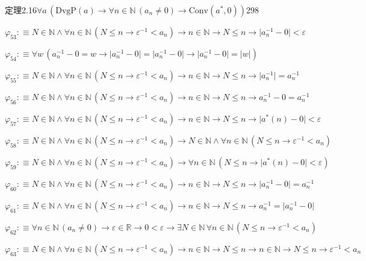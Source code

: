 \begin{fullproof}{定理2.16}{$\forall a\,(\mathrm{DvgP}(a) \to \forall n \in \mathbb{N}\,(a_{n} \neq 0) \to \mathrm{Conv}(a^{\ast},0))$}{298}
\begin{abbrevlist}
\item $\varphi_{53} :\equiv N \in \mathbb{N} \land \forall n \in \mathbb{N}\,(N \leq n \to \varepsilon^{-1} < a_{n}) \to n \in \mathbb{N} \to N \leq n \to \lvert a_{n}^{-1} - 0 \rvert < \varepsilon$
\item $\varphi_{54} :\equiv \forall w\,(a_{n}^{-1} - 0 = w \to \lvert a_{n}^{-1} - 0 \rvert = \lvert a_{n}^{-1} - 0 \rvert \to \lvert a_{n}^{-1} - 0 \rvert = \lvert w \rvert)$
\item $\varphi_{55} :\equiv N \in \mathbb{N} \land \forall n \in \mathbb{N}\,(N \leq n \to \varepsilon^{-1} < a_{n}) \to n \in \mathbb{N} \to N \leq n \to \lvert a_{n}^{-1} \rvert = a_{n}^{-1}$
\item $\varphi_{56} :\equiv N \in \mathbb{N} \land \forall n \in \mathbb{N}\,(N \leq n \to \varepsilon^{-1} < a_{n}) \to n \in \mathbb{N} \to N \leq n \to a_{n}^{-1} - 0 = a_{n}^{-1}$
\item $\varphi_{57} :\equiv N \in \mathbb{N} \land \forall n \in \mathbb{N}\,(N \leq n \to \varepsilon^{-1} < a_{n}) \to n \in \mathbb{N} \to N \leq n \to \lvert a^{\ast}(n) - 0 \rvert < \varepsilon$
\item $\varphi_{58} :\equiv N \in \mathbb{N} \land \forall n \in \mathbb{N}\,(N \leq n \to \varepsilon^{-1} < a_{n}) \to N \in \mathbb{N} \land \forall n \in \mathbb{N}\,(N \leq n \to \varepsilon^{-1} < a_{n})$
\item $\varphi_{59} :\equiv N \in \mathbb{N} \land \forall n \in \mathbb{N}\,(N \leq n \to \varepsilon^{-1} < a_{n}) \to \forall n \in \mathbb{N}\,(N \leq n \to \lvert a^{\ast}(n) - 0 \rvert < \varepsilon)$
\item $\varphi_{60} :\equiv N \in \mathbb{N} \land \forall n \in \mathbb{N}\,(N \leq n \to \varepsilon^{-1} < a_{n}) \to n \in \mathbb{N} \to N \leq n \to \lvert a_{n}^{-1} - 0 \rvert = a_{n}^{-1}$
\item $\varphi_{61} :\equiv N \in \mathbb{N} \land \forall n \in \mathbb{N}\,(N \leq n \to \varepsilon^{-1} < a_{n}) \to n \in \mathbb{N} \to N \leq n \to a_{n}^{-1} = \lvert a_{n}^{-1} - 0 \rvert$
\item $\varphi_{62} :\equiv \forall n \in \mathbb{N}\,(a_{n} \neq 0) \to \varepsilon \in \mathbb{R} \to 0 < \varepsilon \to \exists N \in \mathbb{N}\,\forall n \in \mathbb{N}\,(N \leq n \to \varepsilon^{-1} < a_{n})$
\item $\varphi_{63} :\equiv N \in \mathbb{N} \land \forall n \in \mathbb{N}\,(N \leq n \to \varepsilon^{-1} < a_{n}) \to n \in \mathbb{N} \to N \leq n \to n \in \mathbb{N} \to N \leq n \to \varepsilon^{-1} < a_{n}$

\end{abbrevlist}
\end{fullproof}

